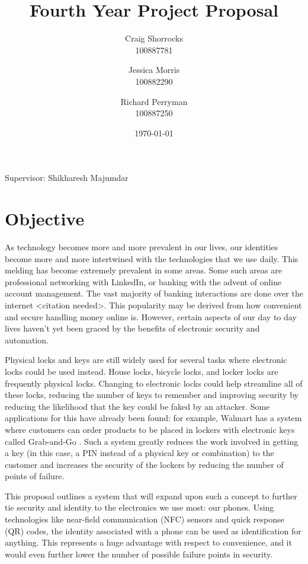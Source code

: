 \documentclass{article}
\title{Fourth Year Project Proposal}
\author{
	Craig Shorrocks \\
	100887781
	\and
	Jessica Morris \\
	100882290
	\and
	Richard Perryman \\
	100887250
}
\date{\today}
\begin{document}
\maketitle

\begin{center}
Supervisor: Shikharesh Majumdar 
\end{center}

\pagebreak

\section{Objective}

As technology becomes more and more prevalent in our lives, our identities become more and more intertwined with the technologies that we use daily. This melding has become extremely prevalent in some areas. Some such areas are professional networking with LinkedIn, or banking with the advent of online account management. The vast majority of banking interactions are done over the internet \textless citation needed\textgreater. This popularity may be derived from how convenient and secure handling money online is. However, certain aspects of our day to day lives haven't yet been graced by the benefits of electronic security and automation.

Physical locks and keys are still widely used for several tasks where electronic locks could be used instead. House locks, bicycle locks, and locker locks are frequently physical locks. Changing to electronic locks could help streamline all of these locks, reducing the number of keys to remember and improving security by reducing the likelihood that the key could be faked by an attacker. Some applications for this have already been found: for example, Walmart has a system where customers can order products to be placed in lockers with electronic keys called Grab-and-Go \cite{WALMART}. Such a system greatly reduces the work involved in getting a key (in this case, a PIN instead of a physical key or combination) to the customer and increases the security of the lockers by reducing the number of points of failure.

This proposal outlines a system that will expand upon such a concept to further tie security and identity to the electronics we use most: our phones. Using technologies like near-field communication (NFC) sensors and quick response (QR) codes, the identity associated with a phone can be used as identification for anything. This represents a huge advantage with respect to convenience, and it would even further lower the number of possible failure points in security.
\end{document}
